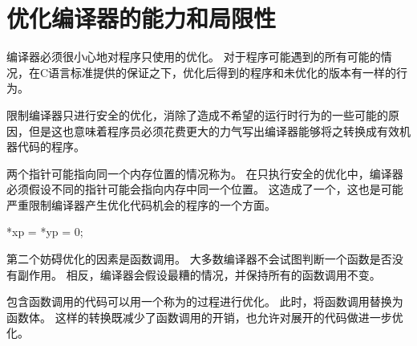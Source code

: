 
\section{优化编译器的能力和局限性}
{
    编译器必须很小心地对程序只使用的优化。
    对于程序可能遇到的所有可能的情况，在C语言标准提供的保证之下，优化后得到的程序和未优化的版本有一样的行为。

    限制编译器只进行安全的优化，消除了造成不希望的运行时行为的一些可能的原因，但是这也意味着程序员必须花费更大的力气写出编译器能够将之转换成有效机器代码的程序。

    两个指针可能指向同一个内存位置的情况称为。
    在只执行安全的优化中，编译器必须假设不同的指针可能会指向内存中同一个位置。
    这造成了一个，这也是可能严重限制编译器产生优化代码机会的程序的一个方面。

    \begin{practicec}
        *xp = *yp = 0;
    \end{practicec}

    第二个妨碍优化的因素是函数调用。
    大多数编译器不会试图判断一个函数是否没有副作用。
    相反，编译器会假设最糟的情况，并保持所有的函数调用不变。

    包含函数调用的代码可以用一个称为的过程进行优化。
    此时，将函数调用替换为函数体。
    这样的转换既减少了函数调用的开销，也允许对展开的代码做进一步优化。
}
